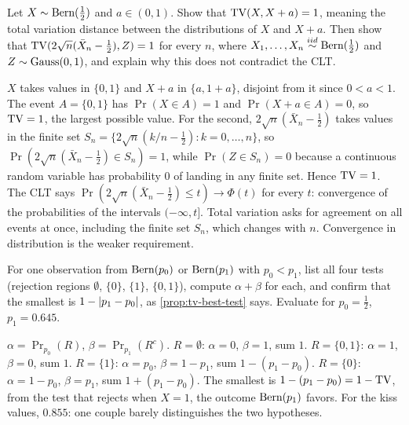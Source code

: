 \begin{exercise}
\label{ex:dist-tv-shift}
Let $X \sim \text{Bern}(\frac12)$ and $a \in (0, 1)$. Show that $\mathrm{TV}(X, X + a) = 1$, meaning the total variation distance between the distributions of $X$ and $X + a$. Then show that $\mathrm{TV}(2\sqrt{n}(\bar{X}_n - \frac12), Z) = 1$ for every $n$, where $X_1, \ldots, X_n \stackrel{iid}{\sim} \text{Bern}(\frac12)$ and $Z \sim \text{Gauss}(0,1)$, and explain why this does not contradict the CLT.
\end{exercise}
\begin{solution}
$X$ takes values in $\{0, 1\}$ and $X + a$ in $\{a, 1 + a\}$, disjoint from it since $0 < a < 1$. The event $A = \{0, 1\}$ has $\Pr(X \in A) = 1$ and $\Pr(X + a \in A) = 0$, so $\mathrm{TV} = 1$, the largest possible value. For the second, $2\sqrt{n}(\bar{X}_n - \frac12)$ takes values in the finite set $S_n = \{2\sqrt{n}(k/n - \frac12) : k = 0, \ldots, n\}$, so $\Pr(2\sqrt{n}(\bar{X}_n - \frac12) \in S_n) = 1$, while $\Pr(Z \in S_n) = 0$ because a continuous random variable has probability $0$ of landing in any finite set. Hence $\mathrm{TV} = 1$. The CLT says $\Pr(2\sqrt{n}(\bar{X}_n - \frac12) \leq t) \to \Phi(t)$ for every $t$: convergence of the probabilities of the intervals $(-\infty, t]$. Total variation asks for agreement on all events at once, including the finite set $S_n$, which changes with $n$. Convergence in distribution is the weaker requirement.
\end{solution}

\begin{exercise}
\label{ex:dist-best-test}
For one observation from $\text{Bern}(p_0)$ or $\text{Bern}(p_1)$ with $p_0 < p_1$, list all four tests (rejection regions $\emptyset$, $\{0\}$, $\{1\}$, $\{0, 1\}$), compute $\alpha + \beta$ for each, and confirm that the smallest is $1 - \lvert p_1 - p_0\rvert$, as \cref{prop:tv-best-test} says. Evaluate for $p_0 = \frac12$, $p_1 = 0.645$.
\end{exercise}
\begin{solution}
$\alpha = \Pr_{p_0}(R)$, $\beta = \Pr_{p_1}(R^c)$. $R = \emptyset$: $\alpha = 0$, $\beta = 1$, sum $1$. $R = \{0, 1\}$: $\alpha = 1$, $\beta = 0$, sum $1$. $R = \{1\}$: $\alpha = p_0$, $\beta = 1 - p_1$, sum $1 - (p_1 - p_0)$. $R = \{0\}$: $\alpha = 1 - p_0$, $\beta = p_1$, sum $1 + (p_1 - p_0)$. The smallest is $1 - (p_1 - p_0) = 1 - \mathrm{TV}$, from the test that rejects when $X = 1$, the outcome $\text{Bern}(p_1)$ favors. For the kiss values, $0.855$: one couple barely distinguishes the two hypotheses.
\end{solution}

